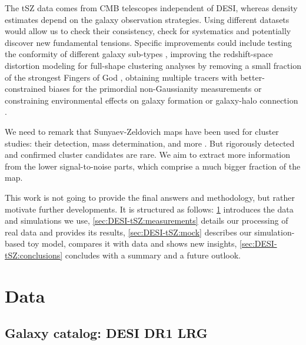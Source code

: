 The tSZ data comes from CMB telescopes independent of DESI, whereas density estimates depend on the galaxy observation strategies.
Using different datasets would allow us to check their consistency, check for systematics and potentially discover new fundamental tensions.
Specific improvements could include
testing the conformity of different galaxy sub-types \citep[e.g.,][]{LSS-color-dependent-stochasticity},
improving the redshift-space distortion modeling for full-shape clustering analyses by removing a small fraction of the strongest Fingers of God \citep{removing-FoG},
obtaining multiple tracers with better-constrained biases for the primordial non-Gaussianity measurements \citep[similarly to][]{multi-tracer-PNG-forecasts}
or constraining environmental effects on galaxy formation or galaxy-halo connection \citep[e.g.,][]{EDR_HOD_LRGQSO2023}.

We need to remark that Sunyaev-Zeldovich maps have been used for cluster studies: their detection, mass determination, and more \citep{Planck-SZ-clusters,ACT-SZ-clusters-DR5,ACT-SZ-clusters-mass-calibration-DR5,SPT-clusters-w-DES+HST-WL,SPT-SZ-clusters-2025}.
But rigorously detected and confirmed cluster candidates are rare.
We aim to extract more information from the lower signal-to-noise parts, which comprise a much bigger fraction of the map.

This work is not going to provide the final answers and methodology, but rather motivate further developments.
It is structured as follows:
\cref{sec:DESI-tSZ:data} introduces the data and simulations we use,
\cref{sec:DESI-tSZ:measurements} details our processing of real data and provides its results,
\cref{sec:DESI-tSZ:mock} describes our simulation-based toy model, compares it with data and shows new insights,
\cref{sec:DESI-tSZ:conclusions} concludes with a summary and a future outlook.

\section{Data}
\label{sec:DESI-tSZ:data}

\subsection{Galaxy catalog: DESI DR1 LRG}

